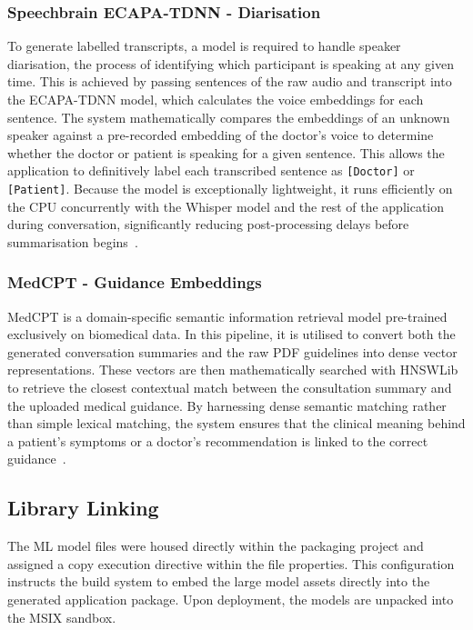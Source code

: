 \subsubsection{Speechbrain ECAPA-TDNN - Diarisation}
To generate labelled transcripts, a model is required to handle speaker diarisation, the process of identifying which participant is speaking at any given time. This is achieved by passing sentences of the raw audio and transcript into the ECAPA-TDNN model, which calculates the voice embeddings for each sentence. The system mathematically compares the embeddings of an unknown speaker against a pre-recorded embedding of the doctor's voice to determine whether the doctor or patient is speaking for a given sentence. This allows the application to definitively label each transcribed sentence as \texttt{[Doctor]} or \texttt{[Patient]}. Because the model is exceptionally lightweight, it runs efficiently on the CPU concurrently with the Whisper model and the rest of the application during conversation, significantly reducing post-processing delays before summarisation begins~\cite{desplanques2020ecapa}.

\subsubsection{MedCPT - Guidance Embeddings}
MedCPT is a domain-specific semantic information retrieval model pre-trained exclusively on biomedical data. In this pipeline, it is utilised to convert both the generated conversation summaries and the raw PDF guidelines into dense vector representations. These vectors are then mathematically searched with HNSWLib to retrieve the closest contextual match between the consultation summary and the uploaded medical guidance. By harnessing dense semantic matching rather than simple lexical matching, the system ensures that the clinical meaning behind a patient's symptoms or a doctor's recommendation is linked to the correct guidance~\cite{jin2023medcpt}.


\subsection{Library Linking}
The ML model files were housed directly within the packaging project and assigned a copy execution directive within the file properties. This configuration instructs the build system to embed the large model assets directly into the generated application package. Upon deployment, the models are unpacked into the MSIX sandbox.

